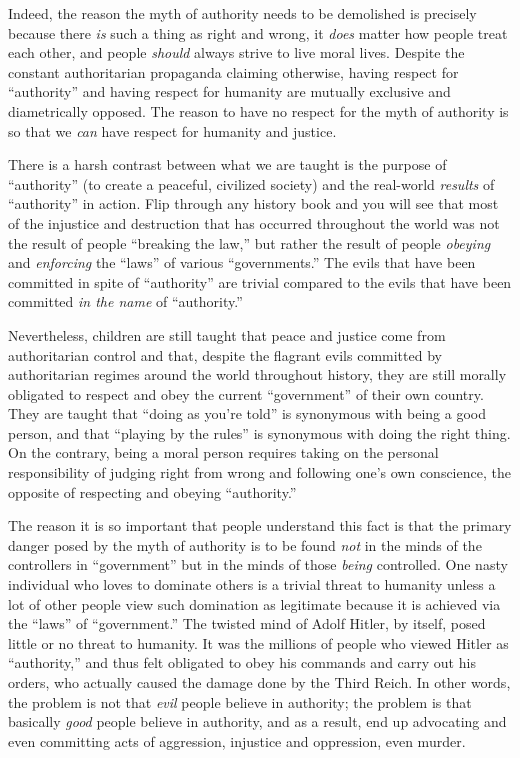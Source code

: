 \documentclass{book}
\begin{document}
Indeed, the reason the myth of authority needs to be demolished is precisely because there \emph{is} such a thing as right and wrong, it \emph{does} matter how people treat each other, and people \emph{should} always strive to live moral lives. Despite the constant authoritarian propaganda claiming otherwise, having respect for \enquote{authority} and having respect for humanity are mutually exclusive and diametrically opposed. The reason to have no respect for the myth of authority is so that we \emph{can} have respect for humanity and justice.

There is a harsh contrast between what we are taught is the purpose of \enquote{authority} (to create a peaceful, civilized society) and the real-world \emph{results} of \enquote{authority} in action. Flip through any history book and you will see that most of the injustice and destruction that has occurred throughout the world was not the result of people \enquote{breaking the law,} but rather the result of people \emph{obeying} and \emph{enforcing} the \enquote{laws} of various \enquote{governments.} The evils that have been committed in spite of \enquote{authority} are trivial compared to the evils that have been committed \emph{in the name} of \enquote{authority.}

Nevertheless, children are still taught that peace and justice come from authoritarian control and that, despite the flagrant evils committed by authoritarian regimes around the world throughout history, they are still morally obligated to respect and obey the current \enquote{government} of their own country. They are taught that \enquote{doing as you're told} is synonymous with being a good person, and that \enquote{playing by the rules} is synonymous with doing the right thing. On the contrary, being a moral person requires taking on the personal responsibility of judging right from wrong and following one's own conscience, the opposite of respecting and obeying \enquote{authority.}

The reason it is so important that people understand this fact is that the primary danger posed by the myth of authority is to be found \emph{not} in the minds of the controllers in \enquote{government} but in the minds of those \emph{being} controlled. One nasty individual who loves to dominate others is a trivial threat to humanity unless a lot of other people view such domination as legitimate because it is achieved via the \enquote{laws} of \enquote{government.} The twisted mind of Adolf Hitler, by itself, posed little or no threat to humanity. It was the millions of people who viewed Hitler as \enquote{authority,} and thus felt obligated to obey his commands and carry out his orders, who actually caused the damage done by the Third Reich. In other words, the problem is not that \emph{evil} people believe in authority; the problem is that basically \emph{good} people believe in authority, and as a result, end up advocating and even committing acts of aggression, injustice and oppression, even murder.
\end{document}
